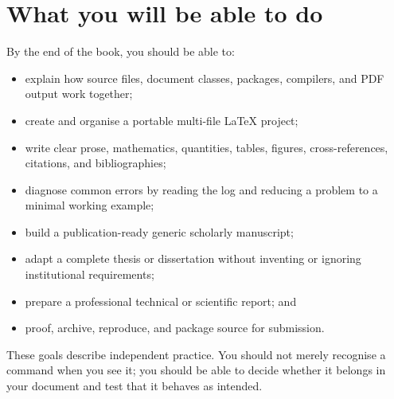 \chapter*{What you will be able to do}

By the end of the book, you should be able to:

\begin{itemize}
  \item explain how source files, document classes, packages, compilers, and
        PDF output work together;
  \item create and organise a portable multi-file \LaTeX{} project;
  \item write clear prose, mathematics, quantities, tables, figures,
        cross-references, citations, and bibliographies;
  \item diagnose common errors by reading the log and reducing a problem to a
        minimal working example;
  \item build a publication-ready generic scholarly manuscript;
  \item adapt a complete thesis or dissertation without inventing or ignoring
        institutional requirements;
  \item prepare a professional technical or scientific report; and
  \item proof, archive, reproduce, and package source for submission.
\end{itemize}

These goals describe independent practice. You should not merely recognise a
command when you see it; you should be able to decide whether it belongs in
your document and test that it behaves as intended.
